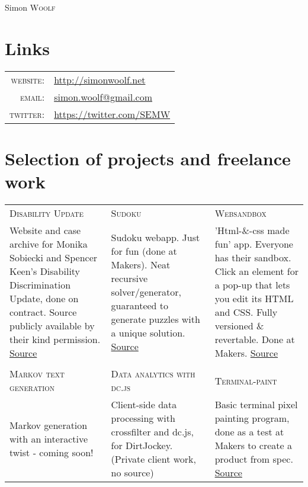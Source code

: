 \documentclass[a4paper,10pt]{article}
\begin{document}
\pagestyle{empty}

\par{\centering
		{\Huge Simon \textsc{Woolf}
	}\bigskip\par}

\section{Links}

\begin{tabular}{rl}
    \textsc{website:}   & \href{http://simonwoolf.net}{http://simonwoolf.net} \\
    \textsc{email:}     & \href{mailto:simon.woolf@gmail.com}{simon.woolf@gmail.com} \\
    \textsc{twitter:}   & \href{https://twitter.com/SEMW}{https://twitter.com/SEMW} \\
\end{tabular}


\section{Selection of projects and freelance work}
\begin{tabularx}{\linewidth}{XXX} 
  \textsc{Disability Update} & \textsc{Sudoku} & \textsc{Websandbox} \\
  
  Website and case archive for Monika Sobiecki and Spencer Keen's Disability
  Discrimination Update, done on contract. Source publicly available by their
  kind permission. \href{https://github.com/SimonWoolf/disability-discrimination-update}{Source} &

  Sudoku webapp. Just for fun (done at Makers). Neat recursive solver/generator, guaranteed 
  to generate puzzles with a unique solution. \href{https://github.com/SimonWoolf/sudoku}{Source} &

  'Html-\&-css made fun' app. Everyone has their sandbox. Click an element for
  a pop-up that lets you edit its HTML and CSS. Fully versioned \& revertable. 
  Done at Makers. \href{https://github.com/SimonWoolf/websandbox}{Source} \\

  & & \\

  \textsc{Markov text generation} & \textsc{Data analytics with dc.js} &
  \textsc{Terminal-paint} \\

  Markov generation with an interactive twist - coming soon! &

  Client-side data processing with crossfilter and dc.js, for DirtJockey. 
  (Private client work, no source) &

  Basic terminal pixel painting program, done as a test at Makers to create a
  product from spec. \href{https://github.com/SimonWoolf/test6}{Source} \\
\end{tabularx}
\end{document}
